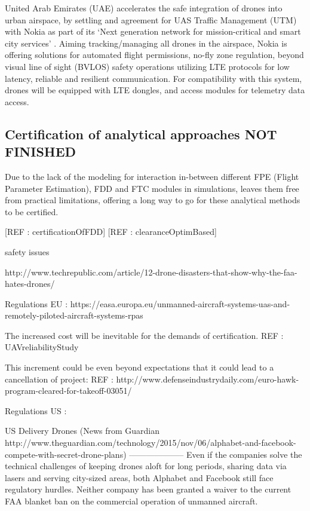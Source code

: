 United Arab Emirates (UAE) accelerates the safe integration of drones into urban airspace, by settling and agreement for UAS Traffic Management (UTM) with Nokia as part of its `Next generation network for mission-critical and smart city services' \cite{nokiaDubai}.
Aiming tracking/managing all drones in the airspace, Nokia is offering solutions for automated flight permissions, no-fly zone regulation, beyond visual line of sight (BVLOS) safety operations utilizing LTE protocols for low latency, reliable and resilient communication. 
For compatibility with this system, drones will be equipped with LTE dongles, and access modules for telemetry data access.



\iffalse
\subsection{Certification of analytical approaches NOT FINISHED }\label{ch2:certificationOfAnalyticalApproaches}

Due to the lack of the modeling for interaction in-between different FPE  (Flight Parameter Estimation), FDD and FTC modules in simulations, leaves them free from practical limitations, offering a long way to go for these analytical methods to be certified. 

[REF : certificationOfFDD]
[REF : clearanceOptimBased]


safety issues

http://www.techrepublic.com/article/12-drone-disasters-that-show-why-the-faa-hates-drones/


Regulations EU : https://easa.europa.eu/unmanned-aircraft-systems-uas-and-remotely-piloted-aircraft-systems-rpas

The increased cost will be inevitable for the demands of certification. REF : UAVreliabilityStudy

This increment could be even beyond expectations that it could lead to a cancellation of project:  REF : http://www.defenseindustrydaily.com/euro-hawk-program-cleared-for-takeoff-03051/

Regulations US : 

US Delivery Drones (News from Guardian http://www.theguardian.com/technology/2015/nov/06/alphabet-and-facebook-compete-with-secret-drone-plans)
--------------------
Even if the companies solve the technical challenges of keeping drones aloft for long periods, sharing data via lasers and serving city-sized areas, both Alphabet and Facebook still face regulatory hurdles. Neither company has been granted a waiver to the current FAA blanket ban on the commercial operation of unmanned aircraft.

